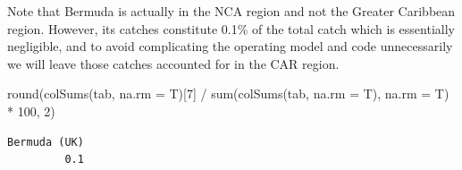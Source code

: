 \documentclass[
  letterpaper,
  oneside,
  open=any]{scrbook}
\newenvironment{Shaded}{\begin{snugshade}}{\end{snugshade}}
\newcommand{\AttributeTok}[1]{\textcolor[rgb]{0.40,0.45,0.13}{#1}}
\newcommand{\DecValTok}[1]{\textcolor[rgb]{0.68,0.00,0.00}{#1}}
\newcommand{\FunctionTok}[1]{\textcolor[rgb]{0.28,0.35,0.67}{#1}}
\newcommand{\NormalTok}[1]{\textcolor[rgb]{0.00,0.23,0.31}{#1}}
\newcommand{\SpecialCharTok}[1]{\textcolor[rgb]{0.37,0.37,0.37}{#1}}
\begin{document}
Note that Bermuda is actually in the NCA region and not the Greater
Caribbean region. However, its catches constitute 0.1\% of the total
catch which is essentially negligible, and to avoid complicating the
operating model and code unnecessarily we will leave those catches
accounted for in the CAR region.

\begin{Shaded}
\begin{Highlighting}[]
\FunctionTok{round}\NormalTok{(}\FunctionTok{colSums}\NormalTok{(tab, }\AttributeTok{na.rm =}\NormalTok{ T)[}\DecValTok{7}\NormalTok{] }\SpecialCharTok{/} \FunctionTok{sum}\NormalTok{(}\FunctionTok{colSums}\NormalTok{(tab, }\AttributeTok{na.rm =}\NormalTok{ T), }\AttributeTok{na.rm =}\NormalTok{ T) }\SpecialCharTok{*} \DecValTok{100}\NormalTok{, }\DecValTok{2}\NormalTok{)}
\end{Highlighting}
\end{Shaded}

\begin{verbatim}
Bermuda (UK) 
         0.1 
\end{verbatim}
\end{document}

